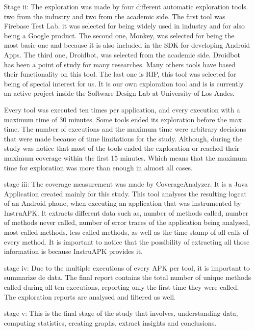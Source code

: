 Stage ii: The exploration was made by four different automatic exploration tools. two from the industry and two from the academic side. The first tool was Firebase Test Lab. it was selected for being widely used in industry and for also being a Google product. The second one, Monkey, was selected for being the most basic one and because it is also included in the SDK for developing Android Apps. The third one, Droidbot, was selected from the academic side. Droidbot has been a point of study for many researches. Many others tools have based their functionality on this tool. The last one is RIP, this tool was selected for being of special interest for us. It is our own exploration tool and is is currently an active project inside the Software Design Lab at University of Los Andes. 

Every tool was executed ten times per application, and every execution with a maximum time of 30 minutes. Some tools ended its exploration before the max time. 
The number of executions and the maximum time were arbitrary decisions that were made because of time limitations for the study. Although, during the study was notice that most of the tools ended the exploration or reached their maximum coverage within the first 15 minutes. Which means that the maximum time for exploration was more than enough in almost all cases. 
 
stage iii: The coverage measurement was made by CoverageAnalyzer. It is a Java Application created mainly for this study. This tool analyses the resulting logcat of an Android phone, when executing an application that was instrumented by InstruAPK. It extracts different data such as, number of methods called, number of  methods never called, number of error traces of the application being analysed, most called methods, less called methods, as well as the time stamp of all calls of every method. It is important to notice that the possibility of extracting all those information is because InstruAPK provides it.

stage iv: Due to the multiple executions of every APK per tool, it is important to summarize de data. The final report contains the total number of unique methods called during all ten executions, reporting only the first time they were called.
The exploration reports are analysed and filtered as well.

stage v: This is the final stage of the study that involves, understanding data, computing statistics, creating graphs, extract insights and conclusions. 

